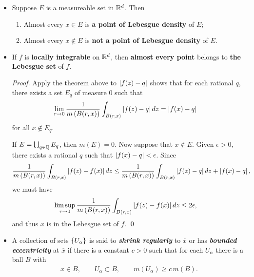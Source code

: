 \documentclass[11pt]{article}
\begin{document}
\begin{itemize}
\item \begin{corollary}
Suppose $E$ is a measureable set in ${\mathbb R}^{d}$. Then
\begin{enumerate}
\item Almost every $x\in E$ is \textbf{a point of Lebesgue density} of $E$;
\item Almost every $x\not\in E$ is \textbf{not a point of Lebesgue density} of $E$.
\end{enumerate}
\end{corollary}

\item \begin{corollary}
If $f$ is \textbf{locally integrable} on ${\mathbb R}^{d}$, then \textbf{almost every point} belongs to\textbf{ the Lebesgue set} of $f$. 
\end{corollary}
\begin{proof}
Apply the theorem above to $\left\lvert f(z)- q \right\rvert$ shows that for each rational $q$, there exists a set $E_{q}$ of measure $0$ such that 
\begin{align*}
\lim\limits_{r\rightarrow 0}\frac{1}{m\left(B(r,x)\right)}\int_{B(r,x)}\left\lvert f(z)-q \right\rvert dz &= \left\lvert f(x)-q \right\rvert
\end{align*} for all $x\not\in E_{q}$.

If $E= \bigcup_{q\in {\mathbb Q}}E_{q}$, then $m(E) = 0$. Now suppose that $x\not\in E$.  Given $\epsilon >0$, there exists a rational $q$ such that $\left\lvert f(x)- q \right\rvert<\epsilon $. Since 
\begin{align*}
\frac{1}{m\left(B(r,x)\right)}\int_{B(r,x)}\left\lvert f(z)- f(x) \right\rvert dz&\le \frac{1}{m\left(B(r,x)\right)}\int_{B(r,x)}\left\lvert f(z)-q \right\rvert dz +   \left\lvert f(x)-q \right\rvert, 
\end{align*}
we must have
\begin{align*}
\limsup\limits_{r\rightarrow 0}\frac{1}{m\left(B(r,x)\right)}\int_{B(r,x)}\left\lvert f(z)- f(x) \right\rvert dz&\le 2\epsilon, 
\end{align*}
and thus $x$ is in the Lebesgue set of $f$. \qed 
\end{proof}

\item \begin{definition}
A collection of sets $\left\{U_{\alpha}\right\}$ is said to \emph{\textbf{shrink regularly}} to $\overline{x}$ or has \emph{\textbf{bounded eccentricity}} at $\overline{x}$ if there is a constant $c>0$ such that for each $U_{\alpha}$ there is a ball $B$ with 
\begin{align*}
\overline{x}\in B, \qquad U_{\alpha} \subset B,  \qquad m(U_{\alpha}) \ge c\,m(B). 
\end{align*}
\end{definition}


\end{itemize}
\end{document}
